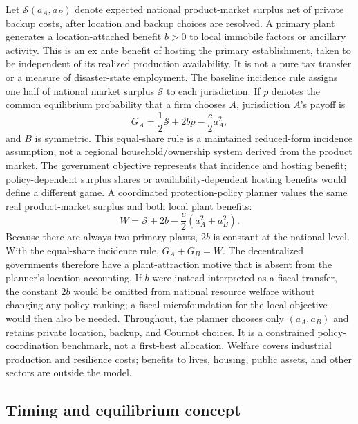 Let $\mathcal S(a_A,a_B)$ denote expected national product-market surplus net of private backup costs, after location and backup choices are resolved. A primary plant generates a location-attached benefit $b>0$ to local immobile factors or ancillary activity. This is an ex ante benefit of hosting the primary establishment, taken to be independent of its realized production availability. It is not a pure tax transfer or a measure of disaster-state employment. The baseline incidence rule assigns one half of national market surplus $\mathcal S$ to each jurisdiction. If $p$ denotes the common equilibrium probability that a firm chooses $A$, jurisdiction $A$'s payoff is
\begin{equation}
G_A=\frac12\mathcal S+2bp-\frac{c}{2}a_A^2,
\label{eq:government-payoff}
\end{equation}
and $B$ is symmetric. This equal-share rule is a maintained reduced-form incidence assumption, not a regional household/ownership system derived from the product market. The government objective represents that incidence and hosting benefit; policy-dependent surplus shares or availability-dependent hosting benefits would define a different game. A coordinated protection-policy planner values the same real product-market surplus and both local plant benefits:
\begin{equation}
W=\mathcal S+2b-\frac{c}{2}(a_A^2+a_B^2).
\label{eq:national-welfare}
\end{equation}
Because there are always two primary plants, $2b$ is constant at the national level. With the equal-share incidence rule, $G_A+G_B=W$. The decentralized governments therefore have a plant-attraction motive that is absent from the planner's location accounting. If $b$ were instead interpreted as a fiscal transfer, the constant $2b$ would be omitted from national resource welfare without changing any policy ranking; a fiscal microfoundation for the local objective would then also be needed. Throughout, the planner chooses only $(a_A,a_B)$ and retains private location, backup, and Cournot choices. It is a constrained policy-coordination benchmark, not a first-best allocation. Welfare covers industrial production and resilience costs; benefits to lives, housing, public assets, and other sectors are outside the model.

\subsection{Timing and equilibrium concept}

